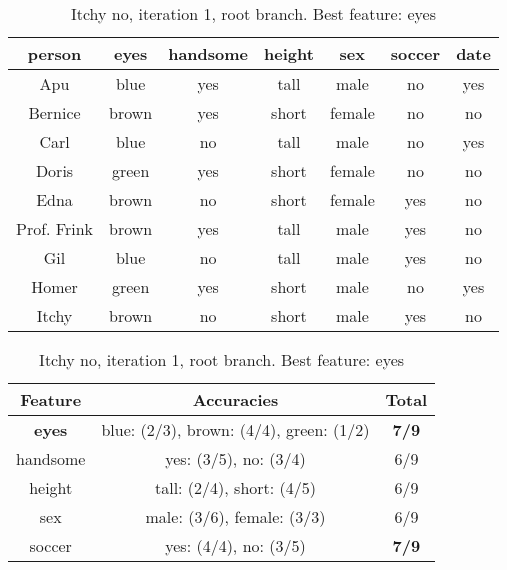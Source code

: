 \begin{table}[h!]
  \centering
  \begin{tabular}{cccccc|c}
    \toprule
    person      & eyes  & handsome & height & sex    & soccer & date\\
    \midrule
    Apu         & blue  & yes      & tall   & male   & no     & yes \\
    Bernice     & brown & yes      & short  & female & no     & no  \\
    Carl        & blue  & no       & tall   & male   & no     & yes \\
    Doris       & green & yes      & short  & female & no     & no  \\
    Edna        & brown & no       & short  & female & yes    & no  \\
    Prof. Frink & brown & yes      & tall   & male   & yes    & no  \\
    Gil         & blue  & no       & tall   & male   & yes    & no  \\
    Homer       & green & yes      & short  & male   & no     & yes \\
    Itchy       & brown & no       & short  & male   & yes    & no  \\
    \bottomrule
  \end{tabular}

  \vspace{.5cm}

  \begin{tabular}{ccc}
    \toprule
    Feature      & Accuracies                              & Total\\
    \midrule
    \textbf{eyes} & blue: (2/3), brown: (4/4), green: (1/2) & \textbf{7/9}\\
    handsome      & yes: (3/5), no: (3/4)                   & 6/9\\
    height        & tall: (2/4), short: (4/5)               & 6/9\\
    sex           & male: (3/6), female: (3/3)              & 6/9\\
    soccer        & yes: (4/4), no: (3/5)                   & \textbf{7/9}\\
    \bottomrule
  \end{tabular}
  \caption*{Itchy no, iteration 1, root branch. Best feature: eyes}
\end{table}

